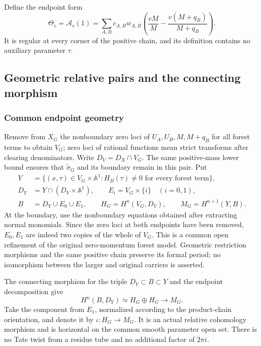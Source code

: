 \documentclass[11pt,a4paper,oneside]{article}
\theoremstyle{plain}
\theoremstyle{definition}
\theoremstyle{remark}
\numberwithin{equation}{section}
\begin{document}
Define the endpoint form
\begin{equation}\label{descent:eq:Theta}
 \Theta_v=\mathcal A_v(1)
   =\sum_{A,B}c_{A,B}w_{A,B}
       \left(\frac{vM}{M}-\frac{v(M+q_B)}{M+q_B}\right).
\end{equation}
It is regular at every corner of the positive chain, and its definition contains no auxiliary parameter $\tau$.


\subsection{Geometric relative pairs and the connecting morphism}
\subsubsection{Common endpoint geometry}
Remove from $X_G$ the nonboundary zero loci of $U_A,U_B,M,M+q_B$ for all forest terms to obtain $V_G$; zero loci of rational functions mean strict transforms after clearing denominators.
Write $D_V=D_X\cap V_G$.
The same positive-mass lower bound ensures that $\widetilde\sigma_G$ and its boundary remain in this pair.
Put
\begin{align}\label{descent:eq:pairs}
 Y&=\{(x,\tau)\in V_G\times\mathbb A^1:
                         H_B(\tau)\ne0\text{ for every forest term}\},\nonumber\\
 D_Y&=Y\cap(D_V\times\mathbb A^1),\qquad
 E_i=V_G\times\{i\}\quad(i=0,1),\nonumber\\
 B&=D_Y\cup E_0\cup E_1,\qquad
 H_G=H^n(V_G,D_V),\qquad M_G=H^{n+1}(Y,B).
\end{align}
At the boundary, use the nonboundary equations obtained after extracting normal monomials.
Since the zero loci at both endpoints have been removed, $E_0,E_1$ are indeed two copies of the whole of $V_G$.
This is a common open refinement of the original zero-momentum forest model. Geometric restriction morphisms and the same positive chain preserve its formal period; no isomorphism between the larger and original carriers is asserted.

The connecting morphism for the triple $D_Y\subset B\subset Y$ and the endpoint decomposition give
\begin{equation}\label{descent:eq:connecting}
 H^n(B,D_Y)\simeq H_G\oplus H_G
       \longrightarrow M_G.
\end{equation}
Take the component from $E_1$, normalized according to the product-chain orientation, and denote it by $\iota:H_G\to M_G$.
It is an actual relative cohomology morphism and is horizontal on the common smooth parameter open set.
There is no Tate twist from a residue tube and no additional factor of $2\pi i$.
\end{document}
